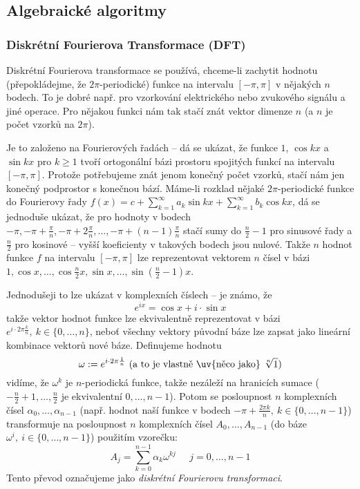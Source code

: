 \subsection{Algebraické algoritmy}

\subsubsection*{Diskrétní Fourierova Transformace (DFT)}

Diskrétní Fourierova transformace se používá, chceme-li zachytit hodnotu (přepokládejme, že $2\pi$-periodické) funkce na intervalu $[-\pi,\pi]$ v nějakých $n$ bodech. To je dobré např. pro vzorkování elektrického nebo zvukového signálu a jiné operace. Pro nějakou funkci nám tak stačí znát vektor dimenze $n$ (a $n$ je počet vzorků na $2\pi$).

Je to založeno na Fourierových řadách -- dá se ukázat, že funkce $1$, $\cos kx$ a $\sin kx$ pro $k\geq 1$ tvoří ortogonální bázi prostoru spojitých funkcí na intervalu $[-\pi,\pi]$. Protože potřebujeme znát jenom konečný počet vzorků, stačí nám jen konečný podprostor s konečnou bází. Máme-li rozklad nějaké $2\pi$-periodické funkce do Fourierovy řady $f(x)= c + \sum_{k=1}^\infty a_k \sin k x + \sum_{k=1}^\infty b_k \cos k x$, dá se jednoduše ukázat, že pro hodnoty v bodech $-\pi,-\pi + \frac{\pi}{n}, -\pi + 2\frac{\pi}{n}, \dots, -\pi + (n-1)\frac{\pi}{n}$ stačí sumy do $\frac{n}{2}-1$ pro sinusové řady a $\frac{n}{2}$ pro kosinové -- vyšší koeficienty v takových bodech jsou nulové. Takže $n$ hodnot funkce $f$ na intervalu $[-\pi,\pi]$ lze reprezentovat vektorem $n$ čísel v bázi $1,\cos x,\dots,\cos \frac{n}{2}x,\sin x,\dots,\sin(\frac{n}{2}-1)x$. 

Jednodušeji to lze ukázat v komplexních číslech -- je známo, že 
$$e^{ix} = \cos x+ i\cdot\sin x$$
takže vektor hodnot funkce lze ekvivalentně reprezentovat v bázi $e^{i\cdot 2\pi\frac{k}{n}},\ k\in\{0,\dots,n\}$, neboť všechny vektory původní báze lze zapsat jako lineární kombinace vektorů nové báze. Definujeme hodnotu
$$\omega := e^{i\cdot 2\pi\frac{1}{n}} \textrm{ (a to je vlastně \uv{něco jako} }\sqrt[n]{1}\textrm{)}$$
vidíme, že $\omega^k$ je $n$-periodická funkce, takže nezáleží na hranicích sumace ($-\frac{n}{2}+1,\dots,\frac{n}{2}$ je ekvivalentní $0,\dots,n-1$). 
Potom se posloupnost $n$ komplexních čísel $\alpha_0, \dots, \alpha_{n-1}$ (např. hodnot naší funkce v bodech $-\pi + \frac{2\pi k}{n},\ k\in\{0,\dots,n-1\}$) transformuje na posloupnost $n$ komplexních čísel $A_0, \dots, A_{n-1}$ (do báze $\omega^i,\ i\in\{0,\dots,n-1\}$) použitím vzorečku:
$$A_j = \sum_{k=0}^{n-1} \alpha_k \omega^{kj}  \;\;\;\;\; j = 0, \dots, n-1$$
Tento převod označujeme jako \emph{diskrétní Fourierovu transformaci}.

